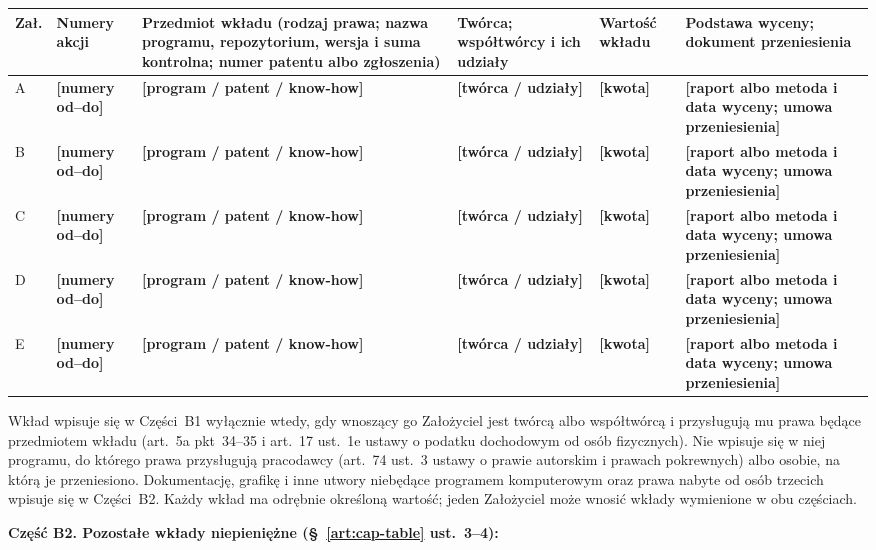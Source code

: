 \documentclass[12pt,a4paper]{report}
\newcommand{\field}[1]{\textbf{[#1]}}
\begin{document}
\begin{center}
\begin{tabularx}{\linewidth}{@{}p{0.9cm} p{2.0cm} >{\raggedright\arraybackslash}X >{\raggedright\arraybackslash}p{2.4cm} p{1.7cm} >{\raggedright\arraybackslash}p{2.6cm}@{}}
\toprule
\textbf{Zał.} & \textbf{Numery akcji} & \textbf{Przedmiot wkładu (rodzaj prawa; nazwa programu, repozytorium, wersja i suma kontrolna; numer patentu albo zgłoszenia)} & \textbf{Twórca; współtwórcy i ich udziały} & \textbf{Wartość wkładu} & \textbf{Podstawa wyceny; dokument przeniesienia} \\
\midrule
A & \field{numery od--do} & \field{program / patent / know-how} & \field{twórca / udziały} & \field{kwota} & \field{raport albo metoda i data wyceny; umowa przeniesienia} \\
B & \field{numery od--do} & \field{program / patent / know-how} & \field{twórca / udziały} & \field{kwota} & \field{raport albo metoda i data wyceny; umowa przeniesienia} \\
C & \field{numery od--do} & \field{program / patent / know-how} & \field{twórca / udziały} & \field{kwota} & \field{raport albo metoda i data wyceny; umowa przeniesienia} \\
D & \field{numery od--do} & \field{program / patent / know-how} & \field{twórca / udziały} & \field{kwota} & \field{raport albo metoda i data wyceny; umowa przeniesienia} \\
E & \field{numery od--do} & \field{program / patent / know-how} & \field{twórca / udziały} & \field{kwota} & \field{raport albo metoda i data wyceny; umowa przeniesienia} \\
\bottomrule
\end{tabularx}
\end{center}

Wkład wpisuje się w Części~B1 wyłącznie wtedy, gdy wnoszący go Założyciel jest twórcą albo współtwórcą i przysługują mu prawa będące przedmiotem wkładu (art.~5a pkt~34--35 i art.~17 ust.~1e ustawy o podatku dochodowym od osób fizycznych). Nie wpisuje się w niej programu, do którego prawa przysługują pracodawcy (art.~74 ust.~3 ustawy o prawie autorskim i prawach pokrewnych) albo osobie, na którą je przeniesiono. Dokumentację, grafikę i inne utwory niebędące programem komputerowym oraz prawa nabyte od osób trzecich wpisuje się w Części~B2. Każdy wkład ma odrębnie określoną wartość; jeden Założyciel może wnosić wkłady wymienione w obu częściach.

\textbf{Część B2. Pozostałe wkłady niepieniężne (§~\ref{art:cap-table} ust.~3--4):}
\end{document}
